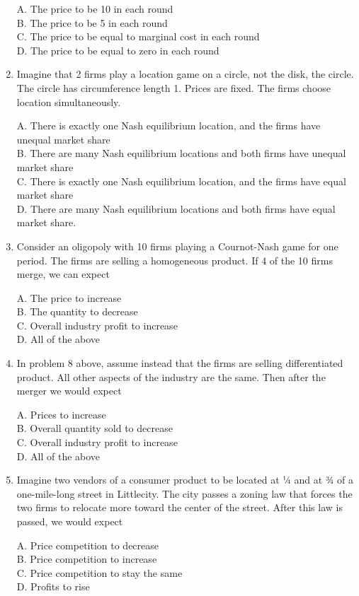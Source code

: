 \documentclass[
]{book}
\begin{document}
\begin{enumerate}
  A. The price to be 10 in each round\\
  B. The price to be 5 in each round\\
  C. The price to be equal to marginal cost in each round\\
  D. The price to be equal to zero in each round
\item
  Imagine that 2 firms play a location game on a circle, not the disk, the circle. The circle has circumference length 1. Prices are fixed. The firms choose location simultaneously.

  A. There is exactly one Nash equilibrium location, and the firms have unequal market share\\
  B. There are many Nash equilibrium locations and both firms have unequal market share\\
  C. There is exactly one Nash equilibrium location, and the firms have equal market share\\
  D. There are many Nash equilibrium locations and both firms have equal market share.
\item
  Consider an oligopoly with 10 firms playing a Cournot-Nash game for one period. The firms are selling a homogeneous product. If 4 of the 10 firms merge, we can expect

  A. The price to increase\\
  B. The quantity to decrease\\
  C. Overall industry profit to increase\\
  D. All of the above
\item
  In problem 8 above, assume instead that the firms are selling differentiated product. All other aspects of the industry are the same. Then after the merger we would expect

  A. Prices to increase\\
  B. Overall quantity sold to decrease\\
  C. Overall industry profit to increase\\
  D. All of the above
\item
  Imagine two vendors of a consumer product to be located at ¼ and at ¾ of a one-mile-long street in Littlecity. The city passes a zoning law that forces the two firms to relocate more toward the center of the street. After this law is passed, we would expect

  A. Price competition to decrease\\
  B. Price competition to increase\\
  C. Price competition to stay the same\\
  D. Profits to rise
\end{enumerate}
\end{document}
